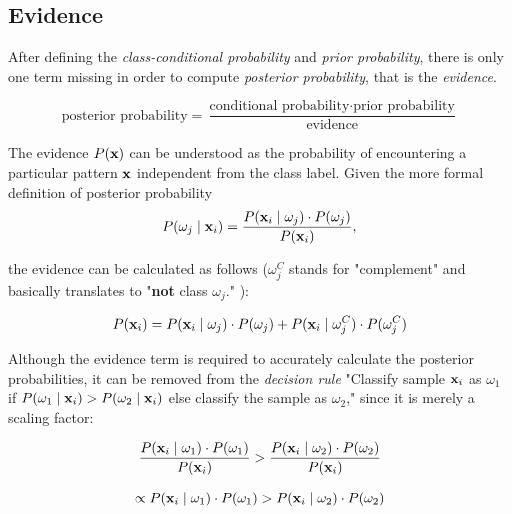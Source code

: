 \documentclass{article}
\begin{document}
\subsection{Evidence}
\label{sec:evidence}

After defining the \emph{class-conditional probability} and \emph{prior probability}, there is only one term missing in order to compute \emph{posterior probability}, that is the \emph{evidence}.

\begin{equation} \text{posterior probability} = \frac{\text{conditional probability} \cdot \text{prior probability}}{\text{evidence}} \end{equation}

The evidence $P(\textbf x)$ can be understood as the probability of encountering a particular pattern $\textbf x$ independent from the class label. Given the more formal definition of posterior probability
\begin{equation} P(\omega_j \mid \textbf x_i) = \frac{P(\textbf x_i \mid \omega_j) \cdot P(\omega_j)}{P(\textbf x_i)}, \end{equation}

the evidence can be calculated as follows ($\omega_j^C$ stands for "complement" and basically translates to "\textbf{not} class $\omega_j$." ):

\begin{equation}P(\textbf x_i) = P(\textbf x_i \mid \omega_j) \cdot P(\omega_j) + P(\textbf x_i \mid \omega_j^C) \cdot P(\omega_j^C)\end{equation}



 Although the evidence term is required to accurately calculate the posterior probabilities, it can be removed from the \emph{decision rule} "Classify sample $\textbf x_i$ as $\omega_1$ if $P(\omega_1 \mid \textbf x_i) > P(\omega_2 \mid \textbf x_i)$ else classify the sample as $\omega_2$,"   since it is merely a scaling factor:


\begin{equation}  \frac{P(\textbf x_i \mid \omega_1) \cdot P(\omega_1)}{P(\textbf x_i)} > \frac{P(\textbf x_i \mid \omega_2) \cdot P(\omega_2)}{P(\textbf x_i)} \end{equation}

\begin{equation}\propto P(\textbf x_i \mid \omega_1) \cdot P(\omega_1) > P(\textbf x_i \mid \omega_2) \cdot P(\omega_2)\end{equation}
\end{document}
